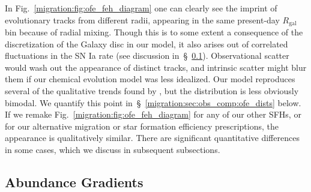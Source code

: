 In Fig.~\ref{migration:fig:ofe_feh_diagram} one can clearly see the imprint of 
evolutionary tracks from different radii, appearing in the same present-day 
$R_\text{gal}$ bin because of radial mixing. 
Though this is to some extent a consequence of the discretization of the 
Galaxy disc in our model, it also arises out of correlated fluctuations in the 
SN Ia rate (see discussion in~\S~\ref{migration:sec:obs_comp:gradient}). 
Observational scatter would wash out the appearance of distinct tracks, and 
intrinsic scatter might blur them if our chemical evolution model was less 
idealized. 
Our model reproduces several of the qualitative trends found by 
\citet{Hayden2015}, but the distribution is less obviously bimodal. 
We quantify this point in~\S~\ref{migration:sec:obs_comp:ofe_dists} below. 
If we remake Fig.~\ref{migration:fig:ofe_feh_diagram} for any of our other SFHs, or for 
our alternative migration or star formation efficiency prescriptions, the 
appearance is qualitatively similar. There are significant quantitative 
differences in some cases, which we discuss in subsequent subsections. 

\subsection{Abundance Gradients} 
\label{migration:sec:obs_comp:gradient} 


